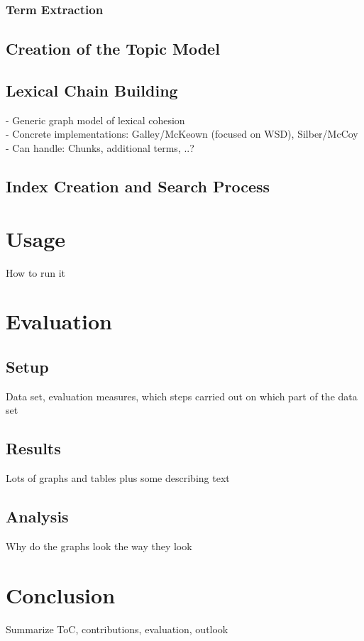 \documentclass[11pt, a4paper, abstraction]{scrartcl}
\begin{document}
\subsubsection{Term Extraction}

\subsection{Creation of the Topic Model}

\subsection{Lexical Chain Building}

- Generic graph model of lexical cohesion \\
- Concrete implementations: Galley/McKeown (focused on WSD), Silber/McCoy \\
- Can handle: Chunks, additional terms, ..? 

\subsection{Index Creation and Search Process}

\section{Usage}

How to run it

\section{Evaluation}

\subsection{Setup}

Data set, evaluation measures, which steps carried out on which part of the data set

\subsection{Results}

Lots of graphs and tables plus some describing text

\subsection{Analysis}

Why do the graphs look the way they look

\section{Conclusion}

Summarize ToC, contributions, evaluation, outlook
\end{document}
